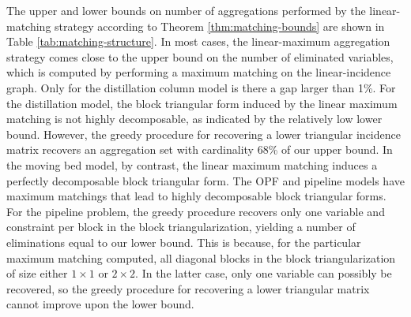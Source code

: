 \documentclass[smallextended]{svjour3}
\begin{document}
The upper and lower bounds on number of aggregations performed by the linear-matching
strategy according to Theorem \ref{thm:matching-bounds} are shown in Table \ref{tab:matching-structure}.
In most cases, the linear-maximum aggregation strategy comes close to the
upper bound on the number of eliminated variables, which is computed by performing a
maximum matching on the linear-incidence graph. Only for the distillation column
model is there a gap larger than 1\%.
For the distillation model, the block triangular form induced by the linear maximum
matching is not highly decomposable, as indicated by the relatively low lower bound.
However, the greedy procedure for recovering a lower triangular incidence matrix
recovers an aggregation set with cardinality 68\% of our upper bound.
In the moving bed model, by contrast, the linear maximum matching induces a perfectly
decomposable block triangular form. The OPF and pipeline models have maximum matchings
that lead to highly decomposable block triangular forms.
For the pipeline problem, the greedy procedure recovers only one variable and constraint
per block in the block triangularization, yielding a number of eliminations equal to
our lower bound. This is because, for the particular maximum matching computed,
all diagonal blocks in the block triangularization of size either $1\times 1$ or $2\times 2$.
In the latter case, only one variable can possibly be recovered, so the greedy
procedure for recovering a lower triangular matrix cannot improve upon the lower bound.

\end{document}
